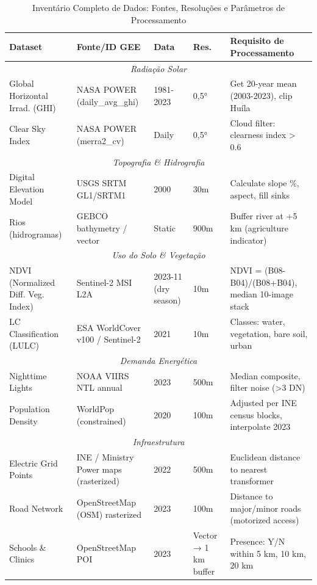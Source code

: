 \documentclass[12pt, a4paper]{article}
\begin{document}
\begin{itemize}
\begin{table}[H]
\centering
\caption{Inventário Completo de Dados: Fontes, Resoluções e Parâmetros de Processamento}
\label{tab:data_inventory}
\footnotesize
\begin{tabular}{|l|l|l|l|l|}
\hline
\textbf{Dataset} & \textbf{Fonte/ID GEE} & \textbf{Data} & \textbf{Res.} & \textbf{Requisito de Processamento} \\
\hline
\multicolumn{5}{|c|}{\textit{Radiação Solar}} \\
\hline
Global Horizontal Irrad. (GHI) & NASA POWER (daily\_avg\_ghi) & 1981-2023 & 0,5° & Get 20-year mean (2003-2023), clip Huíla \\
Clear Sky Index & NASA POWER (merra2\_cv) & Daily & 0,5° & Cloud filter: clearness index > 0.6 \\
\hline
\multicolumn{5}{|c|}{\textit{Topografia \& Hidrografia}} \\
\hline
Digital Elevation Model & USGS SRTM GL1/SRTM1 & 2000 & 30m & Calculate slope \%, aspect, fill sinks \\
Rios (hidrogramas) & GEBCO bathymetry / vector & Static & 900m & Buffer river at +5 km (agriculture indicator) \\
\hline
\multicolumn{5}{|c|}{\textit{Uso do Solo \& Vegetação}} \\
\hline
NDVI (Normalized Diff. Veg. Index) & Sentinel-2 MSI L2A & 2023-11 (dry season) & 10m & NDVI = (B08-B04)/(B08+B04), median 10-image stack \\
LC Classification (LULC) & ESA WorldCover v100 / Sentinel-2 & 2021 & 10m & Classes: water, vegetation, bare soil, urban \\
\hline
\multicolumn{5}{|c|}{\textit{Demanda Energética}} \\
\hline
Nighttime Lights & NOAA VIIRS NTL annual & 2023 & 500m & Median composite, filter noise (>3 DN) \\
Population Density & WorldPop (constrained) & 2020 & 100m & Adjusted per INE census blocks, interpolate 2023 \\
\hline
\multicolumn{5}{|c|}{\textit{Infraestrutura}} \\
\hline
Electric Grid Points & INE / Ministry Power maps (rasterized) & 2022 & 500m & Euclidean distance to nearest transformer \\
Road Network & OpenStreetMap (OSM) rasterized & 2023 & 100m & Distance to major/minor roads (motorized access) \\
Schools \& Clinics & OpenStreetMap POI & 2023 & Vector → 1 km buffer & Presence: Y/N within 5 km, 10 km, 20 km \\
\hline
\end{tabular}
\end{table}


\end{itemize}
\end{document}
